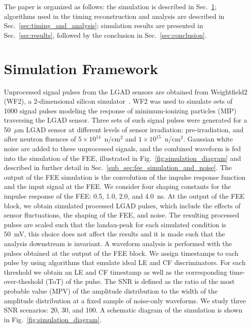 \documentclass[preprint,1p]{elsarticle}
\begin{document}
The paper is organized as follows: the simulation is described in
Sec.~\ref{sec:simulation}; algorithms used in the timing
reconstruction and analysis are described in Sec.~\ref{sec:timing_and_analysis}; simulation results
are presented in Sec.~\ref{sec:results}, followed by the conclusion in
Sec.~\ref{sec:conclusion}.

\section{Simulation Framework}
\label{sec:simulation}

Unprocessed signal pulses from the LGAD sensors are obtained from Weightfield2 (WF2), a 2-dimensional
silicon simulator~\cite{Sadrozinski:2017qpv}. WF2 was used to simulate sets of 1000 signal pulses modeling the
response of minimum-ionizing particles (MIP) traversing the LGAD sensor. Three sets of such signal pulses were
generated for a 50~$\mu$m LGAD sensor at different levels of sensor irradiation: pre-irradiation, and after
neutron fluences of $5\times 10^{14}$~n/cm$^2$ and $1\times 10^{15}$~n/cm$^2$.
Gaussian white noise are added to these unprocessed signals, and the combined waveform is fed into
the simulation of the FEE, illustrated in Fig.~\ref{fig:simulation_diagram} and described in further detail in
Sec.~\ref{sub_sec:fee_simulation_and_noise}. The output of the FEE simulation is the convolution of the
impulse response function and the input signal at the FEE. We consider four shaping constants for the impulse response
of the FEE: 0.5, 1.0, 2.0, and 4.0~\si{ns}. At the output of the FEE block, we obtain simulated processed LGAD pulses,
which include the effects of sensor fluctuations, the shaping of the FEE, and noise.
The resulting processed pulses are scaled such that the landau-peak for each simulated condition is 50~\si{mV},
this choice does not affect the results and it is made such that the analysis downstream is invariant.
A waveform analysis is performed with the pulses obtained at the output of the FEE block.
We assign timestamps to each pulse by using algorithms that emulate
ideal LE and CF discriminators. For each threshold we obtain an LE and CF timestamp as well as the corresponding
time-over-theshold (ToT) of the pulse. The SNR is defined as the ratio of the most probable value (MPV) of the
amplitude distribution to the width of the amplitude distribution at a fixed sample of noise-only waveforms.
We study three SNR scenarios: 20, 30, and 100.
A schematic diagram of the simulation is shown in Fig.~\ref{fig:simulation_diagram}.
\end{document}

